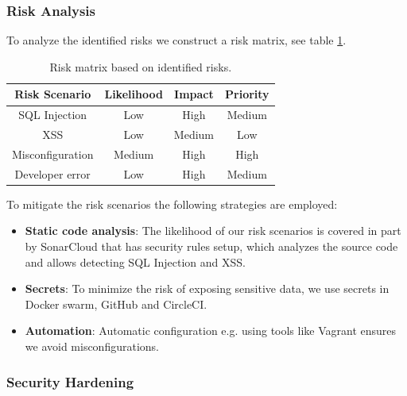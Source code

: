 
\subsubsection*{Risk Analysis}
To analyze the identified risks we construct a risk matrix, see table \ref{tab:risk_matrix}.

\begin{table} [H]
    \centering
    \begin{tabular}{|c||c|c|c|}
        \hline
        Risk Scenario & Likelihood & Impact & Priority \\ \hline\hline
        SQL Injection & Low & High & Medium\\ \hline
        XSS & Low & Medium & Low \\ \hline 
        Misconfiguration & Medium & High & High \\ \hline 
        Developer error & Low & High & Medium \\ \hline
    \end{tabular}
    \caption{Risk matrix based on identified risks.}
    \label{tab:risk_matrix}
\end{table}

To mitigate the risk scenarios the following strategies are employed:
\begin{itemize}
    \item \textbf{Static code analysis}: The likelihood of our risk scenarios is covered in part by SonarCloud that has security rules setup, which analyzes the source code and allows detecting SQL Injection and XSS. %
    \item \textbf{Secrets}: To minimize the risk of exposing sensitive data, we use secrets in Docker swarm, GitHub and CircleCI. 
    \item \textbf{Automation}: Automatic configuration e.g. using tools like Vagrant ensures we avoid misconfigurations.
\end{itemize}

\subsubsection*{Security Hardening}

